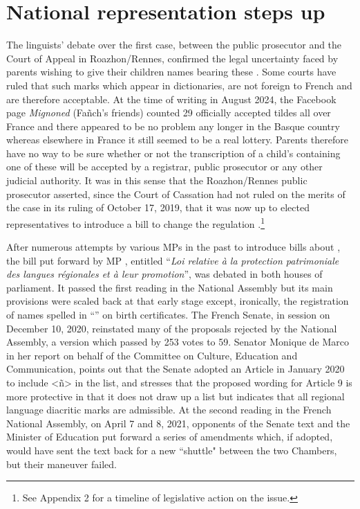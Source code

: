 \documentclass[output=paper,colorlinks,citecolor=brown]{langscibook}
\begin{document}
\section{National representation steps up}

The linguists' debate over the first  case, between the public prosecutor and the Court of Appeal in Roazhon\slash Rennes, confirmed the legal uncertainty faced by parents wishing to give their children names bearing these . Some courts have ruled that such marks which appear in dictionaries, are not foreign to French and are therefore acceptable. At the time of writing in August 2024, the Facebook page \textit{Mignoned } (Fañch’s friends) counted 29 officially accepted tildes all over France and there appeared to be no problem any longer in the Basque country whereas elsewhere in France it still seemed to be a real lottery. Parents therefore have no way to be sure whether or not the transcription of a child’s  containing one of these  will be accepted by a registrar, public prosecutor or any other judicial authority. It was in this sense that the Roazhon/Rennes public prosecutor asserted, since the Court of Cassation had not ruled on the merits of the case in its ruling of October 17, 2019, that it was now up to elected representatives to introduce a bill to change the regulation \citep{sm:Zabaleta2020}.\footnote{See Appendix 2 for a timeline of legislative action on the issue.} 

After numerous attempts by various MPs in the past to introduce bills about , the bill put forward by MP , entitled ``\textit{Loi relative à la protection patrimoniale des langues régionales et à leur promotion}”, was debated in both houses of parliament. It passed the first reading in the National Assembly but its main provisions were scaled back at that early stage except, ironically, the registration of names spelled in ``” on birth certificates. The French Senate, in session on December 10, 2020, reinstated many of the proposals rejected by the National Assembly, a version which passed by 253 votes to 59. Senator Monique de Marco in her report on behalf of the Committee on Culture, Education and Communication, points out that the Senate adopted an Article in January 2020 to include <ñ> in the list, and stresses that the proposed wording for Article 9 is more protective in that it does not draw up a list but indicates that all regional language diacritic marks are admissible. At the second reading in the French National Assembly, on April 7 and 8, 2021, opponents of the Senate text and the Minister of Education put forward a series of amendments which, if adopted, would have sent the text back for a new ``shuttle" between the two Chambers, but their maneuver failed. 
\end{document}
